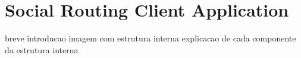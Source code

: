 \section{Social Routing Client Application}
        breve introducao
        imagem com estrutura interna
        explicacao de cada componente da estrutura interna